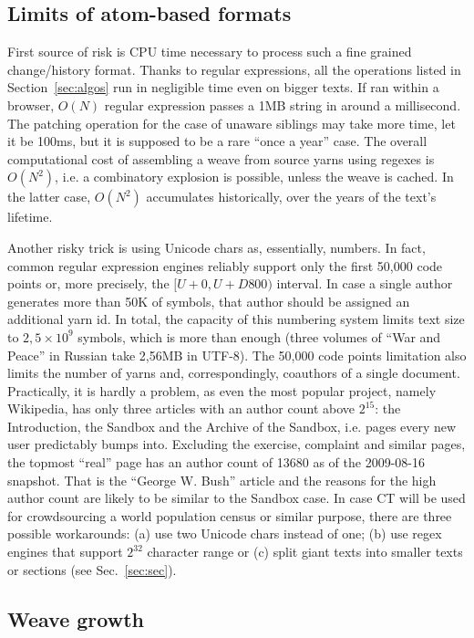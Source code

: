 \documentclass{sig-alternate}
\begin{document}
\subsection{Limits of atom-based formats} \label{sec:formats}
First source of risk is CPU time necessary to process such a fine grained change/history format.
Thanks to regular expressions, all the operations listed in Section~\ref{sec:algos} run in negligible time even on bigger texts. 
If ran within a browser, $O(N)$ regular expression passes a 1MB string in around a millisecond.
The patching operation for the case of unaware siblings may take more time, let it be 100ms, but it is supposed to be a rare ``once a year'' case.
The overall computational cost of assembling a weave from source yarns using regexes is $O(N^{2})$, i.e. a combinatory explosion is possible, unless the weave is cached.
In the latter case, $O(N^{2})$ accumulates historically, over the years of the text's lifetime.

Another risky trick is using Unicode chars as, essentially, numbers.
In fact, common regular expression engines reliably support only the first 50,000 code points or, more precisely, the $[U+0,U+D800)$ interval. 
In case a single author generates more than 50K of symbols, that author should be assigned an additional yarn id.
In total, the capacity of this numbering system limits text size to $2,5\times10^9$ symbols, which is more than enough (three volumes of ``War and Peace'' in Russian take 2,56MB in UTF-8). 
The 50,000 code points limitation also limits the number of yarns and, correspondingly, coauthors of a single document.
Practically, it is hardly a problem, as even the most popular project, namely Wikipedia, has only three articles with an author count above $2^{15}$: the Introduction, the Sandbox and the Archive of the Sandbox, i.e. pages every new user predictably bumps into.
Excluding the exercise, complaint and similar pages, the topmost ``real'' page has an author count of 13680 as of the 2009-08-16 snapshot.
That is the ``George W. Bush'' article and the reasons for the high author count are likely to be similar to the Sandbox case.
In case CT will be used for crowdsourcing a world population census or similar purpose, there are three possible workarounds: (a) use two Unicode chars instead of one; (b) use regex engines that support $2^{32}$ character range or (c) split giant texts into smaller texts or sections (see Sec.~\ref{sec:sec}).

\subsection{Weave growth}	\label{sec:weave-growth}
\end{document}
